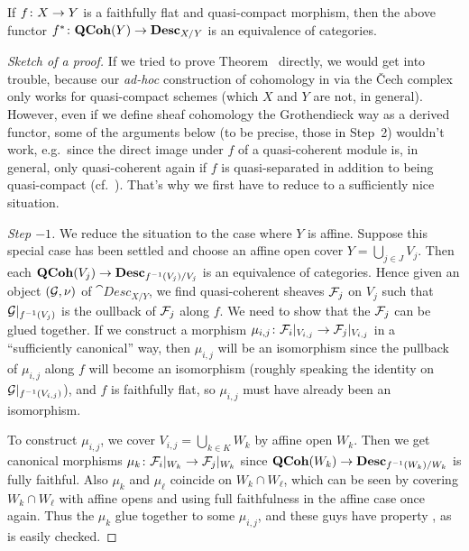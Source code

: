 \documentclass[a4paper,parskip=half,numbers=enddot, DIV=12]{scrreprt}
\begin{document}
\begin{thm}
	If $f\colon X\morphism Y$ is a faithfully flat and quasi-compact morphism, then the above functor $f^*\colon\cat{QCoh}(Y)\morphism\cat{Desc}_{X/Y}$ is an equivalence of categories.
\end{thm}
\begin{proof}[Sketch of a proof]
	If we tried to prove Theorem~ directly, we would get into trouble, because our \emph{ad-hoc} construction of cohomology in \cite[Section~1.2]{alggeo2} via the \v Cech complex only works for quasi-compact schemes (which $X$ and $Y$ are not, in general). However, even if we define sheaf cohomology the Grothendieck way as a derived functor, some of the arguments below (to be precise, those in Step~2) wouldn't work, e.g.\ since the direct image under $f$ of a quasi-coherent module is, in general, only quasi-coherent again if $f$ is quasi-separated in addition to being quasi-compact (cf.\ \cite[Proposition~1.5.2]{alggeo1}). That's why we first have to reduce to a sufficiently nice situation.
	
	\emph{Step $-\text{1}$.} We reduce the situation to the case where $Y$ is affine. Suppose this special case has been settled and choose an affine open cover $Y=\bigcup_{j\in J}V_j$. Then each $\cat{QCoh}(V_j)\morphism\cat{Desc}_{f^{-1}(V_j)/V_j}$ is an equivalence of categories. Hence given an object $(\mathcal{G},\nu)$ of $\cat{Desc}_{X/Y}$, we find quasi-coherent sheaves $\mathcal{F}_j$ on $V_j$ such that $\mathcal{G}|_{f^{-1}(V_j)}$ is the oullback of $\mathcal{F}_j$ along $f$. We need to show that the $\mathcal{F}_j$ can be glued together. If we construct a morphism $\mu_{i,j}\colon \Ff_i|_{V_{i,j}}\morphism\Ff_j|_{V_{i,j}}$ in a ``sufficiently canonical'' way, then $\mu_{i,j}$ will be an isomorphism since the pullback of $\mu_{i,j}$ along $f$ will become an isomorphism (roughly speaking the identity on $\mathcal{G}|_{f^{-1}(V_{i,j})}$), and $f$ is faithfully flat, so $\mu_{i,j}$ must have already been an isomorphism.
	
	To construct $\mu_{i,j}$, we cover $V_{i,j}=\bigcup_{k\in K}W_k$ by affine open $W_k$. Then we get canonical morphisms $\mu_k\colon \Ff_i|_{W_k}\morphism\Ff_j|_{W_k}$ since $\cat{QCoh}(W_k)\morphism\cat{Desc}_{f^{-1}(W_k)/W_k}$ is fully faithful. Also $\mu_k$ and $\mu_\ell$ coincide on $W_k\cap W_\ell$, which can be seen by covering $W_k\cap W_\ell$ with affine opens and using full faithfulness in the affine case once again. Thus the $\mu_k$ glue together to some $\mu_{i,j}$, and these guys have property , as is easily checked.
	

\end{proof}
\end{document}
